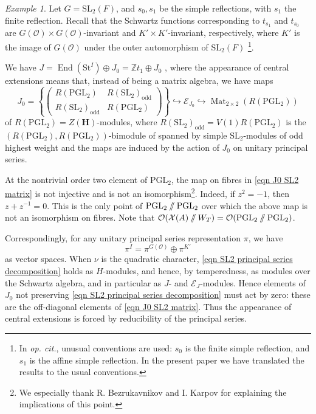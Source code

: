 \documentclass[10pt]{article}
\def\into{\mathrel{\hookrightarrow}}
\newcommand{\sett}[1]{\left\{#1\right\}}
\DeclareMathOperator{\End}{End}
\DeclareMathOperator{\Mat}{Mat}
\newcommand{\git}{\mathbin{
  \mathchoice{/\mkern-6mu/}%
    {/\mkern-6mu/}%
    {/\mkern-5mu/}%
    {/\mkern-5mu/}}}%
\newcommand{\X}{\mathcal{X}}
\newcommand{\HH}{\mathbf{H}}
\newcommand{\Ee}{\mathcal{E}}
\newcommand{\Z}{\mathbb{Z}}
\newcommand{\Oo}{\mathcal{O}}
\newcommand{\PGL}{\mathrm{PGL}}
\newcommand{\SL}{\mathrm{SL}}
\newcommand{\St}{\mathrm{St}}
\theoremstyle{definition}
\theoremstyle{remark}
\newtheorem{ex}{Example}
\begin{document}
\begin{ex}
\label{ex SL2 central ext}
Let $G=\SL_2(F)$, and $s_0, s_1$ be the simple reflections,
with $s_1$ the finite reflection. Recall that 
the Schwartz functions corresponding to $t_{s_1}$ and $t_{s_0}$ are
$G(\Oo)\times G(\Oo)$-invariant and $K'\times K'$-invariant, respectively, 
where $K'$ is the image of $G(\Oo)$ under the outer automorphism of $\SL_2(F)$ \cite{DSL2}
\footnote[1]{In \textit{op. cit.}, unusual conventions are used: $s_0$ is the finite simple reflection, and $s_1$ is the affine simple reflection. In the present paper we have translated the results to the usual conventions.}.

We have $J=\End(\St^I)\oplus J_0=\Z t_1\oplus J_0$ \cite{BK}, where the appearance of central
extensions means that, instead of being a matrix algebra, we have maps
%
\begin{equation}
\label{eqn J0 SL2 matrix}
J_0=\sett{\begin{pmatrix}
R(\PGL_2)& R(\SL_2)_{\mathrm{odd}}\\
R(\SL_2)_{\mathrm{odd}}&R(\PGL_2)
\end{pmatrix}}\into\Ee_{J_0}\into\Mat_{2\times 2}(R(\PGL_2))
\end{equation}
%
of $R(\PGL_2)=Z(\HH)$-modules, where $R(\SL_2)_{\mathrm{odd}}=V(1)R(\PGL_2)$ is the 
$(R(\PGL_2),R(\PGL_2))$-bimodule of spanned by simple $\SL_2$-modules of odd highest weight 
\cite[Section 8.3]{XiAMemoir} and the maps are induced by the action of $J_0$ on unitary principal series.

At the nontrivial order two element of $\PGL_2$, the map on fibres in \eqref{eqn J0 SL2 matrix}
is not injective and is not an isomorphism\footnote[1]{We especially thank R. Bezrukavnikov and I. Karpov for explaining the implications of this point.}. Indeed, if $z^2=-1$, then $z+z^{-1}=0$. This is the only point 
of $\PGL_2\git\PGL_2$ over which the above map is not an isomorphism
on fibres. Note that $\Oo(\X(A)\git W_T)=\Oo(\PGL_2\git\PGL_2)$.

Correspondingly, for any unitary principal series representation $\pi$, we have
%
\begin{equation}
\label{eqn SL2 principal series decomposition}
\pi^I=\pi^{G(\Oo)}\oplus\pi^{K'}
\end{equation}
%
as vector spaces. 
When $\nu$ is the quadratic character, 
\eqref{eqn SL2 principal series decomposition} holds as $H$-modules, and hence, by temperedness, as 
modules over the Schwartz algebra, and in particular as $J$- and $\Ee_J$-modules. Hence elements of 
$J_0$ not preserving \eqref{eqn SL2 principal series decomposition} must act by zero: these are the 
off-diagonal elements of \eqref{eqn J0 SL2 matrix}. Thus the appearance of central extensions is 
forced by reducibility of the principal series.
\end{ex}
\end{document}
